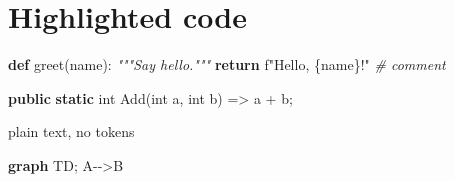 \documentclass[
]{article}
\author{}
\date{}
\newenvironment{Shaded}{}{}
\newcommand{\BuiltInTok}[1]{\textcolor[rgb]{0.00,0.50,0.00}{#1}}
\newcommand{\CommentTok}[1]{\textcolor[rgb]{0.38,0.63,0.69}{\textit{#1}}}
\newcommand{\ConstantTok}[1]{\textcolor[rgb]{0.53,0.00,0.00}{#1}}
\newcommand{\ControlFlowTok}[1]{\textcolor[rgb]{0.00,0.44,0.13}{\textbf{#1}}}
\newcommand{\DataTypeTok}[1]{\textcolor[rgb]{0.56,0.13,0.00}{#1}}
\newcommand{\FunctionTok}[1]{\textcolor[rgb]{0.02,0.16,0.49}{#1}}
\newcommand{\KeywordTok}[1]{\textcolor[rgb]{0.00,0.44,0.13}{\textbf{#1}}}
\newcommand{\NormalTok}[1]{#1}
\newcommand{\OperatorTok}[1]{\textcolor[rgb]{0.40,0.40,0.40}{#1}}
\newcommand{\PreprocessorTok}[1]{\textcolor[rgb]{0.74,0.48,0.00}{#1}}
\newcommand{\SpecialCharTok}[1]{\textcolor[rgb]{0.25,0.44,0.63}{#1}}
\newcommand{\SpecialStringTok}[1]{\textcolor[rgb]{0.73,0.40,0.53}{#1}}
\newcommand{\StringTok}[1]{\textcolor[rgb]{0.25,0.44,0.63}{#1}}
\newcommand{\VariableTok}[1]{\textcolor[rgb]{0.10,0.09,0.49}{#1}}
\begin{document}
\section{Highlighted code}\label{highlighted-code}

\begin{Shaded}
\begin{Highlighting}[]
\KeywordTok{def}\NormalTok{ greet(name):}
    \CommentTok{"""Say hello."""}
    \ControlFlowTok{return} \SpecialStringTok{f"Hello, }\SpecialCharTok{\{}\NormalTok{name}\SpecialCharTok{\}}\SpecialStringTok{!"}  \CommentTok{\# comment}
\end{Highlighting}
\end{Shaded}

\begin{Shaded}
\end{Shaded}

\begin{Shaded}
\begin{Highlighting}[]
\KeywordTok{public} \KeywordTok{static} \DataTypeTok{int} \FunctionTok{Add}\OperatorTok{(}\DataTypeTok{int}\NormalTok{ a}\OperatorTok{,} \DataTypeTok{int}\NormalTok{ b}\OperatorTok{)} \OperatorTok{=\textgreater{}}\NormalTok{ a }\OperatorTok{+}\NormalTok{ b}\OperatorTok{;}
\end{Highlighting}
\end{Shaded}

\begin{Shaded}
\begin{Highlighting}[]
\NormalTok{plain text, no tokens}
\end{Highlighting}
\end{Shaded}

\begin{Shaded}
\begin{Highlighting}[]
\KeywordTok{graph} \ConstantTok{TD}\NormalTok{; }\DataTypeTok{A}\PreprocessorTok{{-}{-}\textgreater{}}\DataTypeTok{B}
\end{Highlighting}
\end{Shaded}

\begin{Shaded}
\begin{Highlighting}[]

\end{Highlighting}
\end{Shaded}
\end{document}
